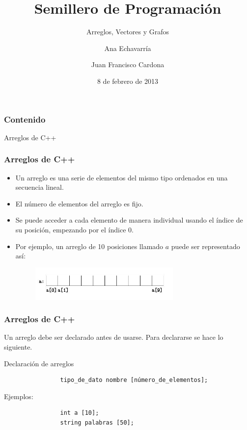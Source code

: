 \documentclass{beamer}
\title{Semillero de Programación}
\subtitle{Arreglos, Vectores y Grafos}
\author{Ana Echavarría \and Juan Francisco Cardona}
\institute{Universidad EAFIT}
\date{8 de febrero de 2013}
\begin{document}
\begin{frame}
	\titlepage
\end{frame}

\begin{frame}
	\frametitle{Contenido}
	\tableofcontents
\end{frame}


\begin{section}{Arreglos de C++}
	\begin{frame}[fragile]
		\frametitle{Arreglos de C++}
		\begin{itemize}
			\item{Un arreglo es una serie de elementos del mismo tipo ordenados en una secuencia lineal.}
			\item{El número de elementos del arreglo es fijo.}
			\item{Se puede acceder a cada elemento de manera individual usando el índice de su posición, empezando por el índice 0.}
			\item{Por ejemplo, un arreglo de 10 posiciones llamado $a$ puede ser representado así:}
			\begin{figure}
				\includegraphics[width = 0.7\textwidth]{arreglo.jpg}
			\end{figure}			
		\end{itemize}
	\end{frame}
	
	\begin{frame}[fragile]
		\frametitle{Arreglos de C++}
		Un arreglo debe ser declarado antes de usarse. Para declararse se hace lo siguiente.
		\begin{block}{Declaración de arreglos}
			\begin{verbatim}
				tipo_de_dato nombre [número_de_elementos];
			\end{verbatim}
			Ejemplos:\\
			\begin{verbatim}
				int a [10];
				string palabras [50];
			\end{verbatim}			
		\end{block}		
	\end{frame}
	

\end{section}
\end{document}
